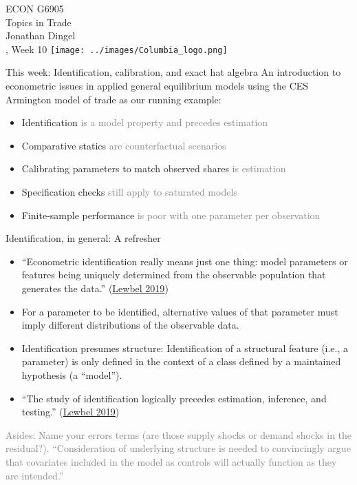 \documentclass[11pt,notes=hide,aspectratio=169]{beamer}
\begin{document}
\begin{frame}[plain]
\begin{center}
\large
\textcolor{columbiadarkblue}{ECON G6905\\
Topics in Trade\\ 
Jonathan Dingel\\
\semester, Week 10}
\vfill 
\texttt{[image: ../images/Columbia\_logo.png]}
\end{center}
\end{frame}
\begin{frame}{This week: Identification, calibration, and exact hat algebra}
An introduction to econometric issues in applied general equilibrium models
using the CES Armington model of trade as our running example:
\begin{itemize}
\item Identification \textcolor{gray}{is a model property and precedes estimation}
\item Comparative statics \textcolor{gray}{are counterfactual scenarios}
\item Calibrating parameters to match observed shares \textcolor{gray}{is estimation}
\item Specification checks \textcolor{gray}{still apply to saturated models}
\item Finite-sample performance \textcolor{gray}{is poor with one parameter per observation}
\end{itemize}
\end{frame}
\begin{frame}{Identification, in general: A refresher}
\begin{itemize}
\item ``Econometric identification really means just one thing: model parameters or features being uniquely determined from the observable population that generates the data.'' (\href{https://www.aeaweb.org/articles?id=10.1257/jel.20181361}{Lewbel 2019})
\item For a parameter to be identified, alternative values of that parameter must imply different distributions of the observable data.
\item Identification presumes structure: Identification of a structural feature (i.e., a parameter) is only defined in the context of a class defined by a maintained hypothesis (a ``model'').
\item ``The study of identification logically precedes estimation, inference, and testing.'' (\href{https://www.aeaweb.org/articles?id=10.1257/jel.20181361}{Lewbel 2019}) 
\end{itemize}
{\footnotesize \textcolor{gray}{Asides: Name your errors terms (are those supply shocks or demand shocks in the residual?). ``Consideration of underlying structure is needed to convincingly argue that covariates included in the model as controls will actually function as they are intended.''}\par}
\end{frame}
\end{document}
